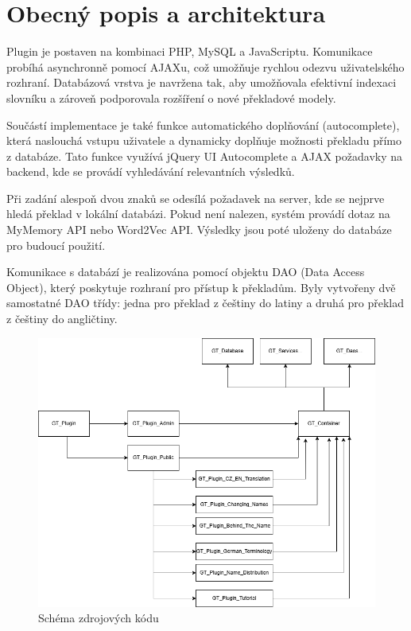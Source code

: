 \documentclass[czech, ba, kiv, he]{fasthesis}
\begin{document}
\section{Obecný popis a architektura}
Plugin je postaven na kombinaci PHP, MySQL a JavaScriptu. Komunikace probíhá asynchronně pomocí AJAXu, což umožňuje rychlou odezvu uživatelského rozhraní. Databázová vrstva je navržena tak, aby umožňovala efektivní indexaci slovníku a zároveň podporovala rozšíření o nové překladové modely. 

Součástí implementace je také funkce automatického doplňování (autocomplete), která naslouchá vstupu uživatele a dynamicky doplňuje možnosti překladu přímo z databáze. Tato funkce využívá jQuery UI Autocomplete a AJAX požadavky na backend, kde se provádí vyhledávání relevantních výsledků. 

Při zadání alespoň dvou znaků se odesílá požadavek na server, kde se nejprve hledá překlad v lokální databázi. Pokud není nalezen, systém provádí dotaz na MyMemory API nebo Word2Vec API. Výsledky jsou poté uloženy do databáze pro budoucí použití. 

Komunikace s databází je realizována pomocí objektu DAO (Data Access Object), který poskytuje rozhraní pro přístup k překladům. Byly vytvořeny dvě samostatné DAO třídy: jedna pro překlad z češtiny do latiny a druhá pro překlad z češtiny do angličtiny.

\begin{figure}[h]  
    \centering  
    \includegraphics[width=1\textwidth]{genealogy_components.png}  
    \caption{Schéma zdrojových kódu}  
\end{figure}
\end{document}
